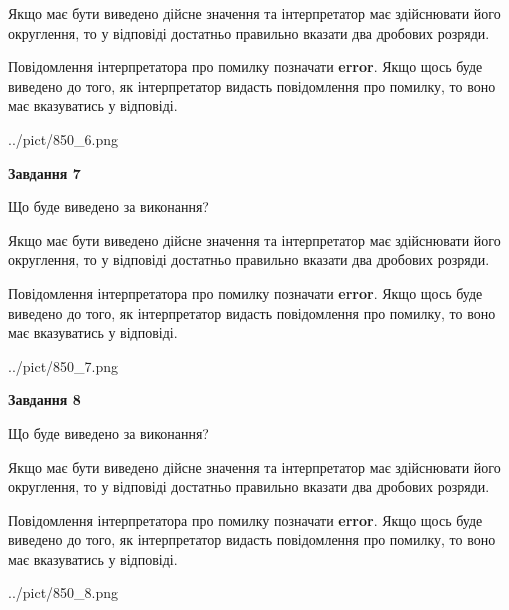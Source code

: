 \documentclass[12pt, ukrainian]{article}
\begin{document}
{\begin {Large}
Якщо має бути виведено дійсне значення та інтерпретатор має здійснювати його округлення, 
то у відповіді достатньо правильно вказати два дробових розряди.

Повідомлення інтерпретатора про помилку позначати \textbf{error}.
Якщо щось буде виведено до того, як інтерпретатор видасть повідомлення про помилку, 
то воно має вказуватись у відповіді. \par

\begin{center}
	{../pict/850_6.png}
\end{center}
\newpage

{\begin {center}\textbf{Завдання 7}\end {center}}\par
Що буде виведено за виконання? \par

Якщо має бути виведено дійсне значення та інтерпретатор має здійснювати його округлення, 
то у відповіді достатньо правильно вказати два дробових розряди.

Повідомлення інтерпретатора про помилку позначати \textbf{error}.
Якщо щось буде виведено до того, як інтерпретатор видасть повідомлення про помилку, 
то воно має вказуватись у відповіді. \par

\begin{center}
	{../pict/850_7.png}
\end{center}
\newpage

{\begin {center}\textbf{Завдання 8}\end {center}}\par
Що буде виведено за виконання? \par

Якщо має бути виведено дійсне значення та інтерпретатор має здійснювати його округлення, 
то у відповіді достатньо правильно вказати два дробових розряди.

Повідомлення інтерпретатора про помилку позначати \textbf{error}.
Якщо щось буде виведено до того, як інтерпретатор видасть повідомлення про помилку, 
то воно має вказуватись у відповіді. \par

\begin{center}
	{../pict/850_8.png}
\end{center}
\newpage


\end{Large}}
\end{document}
